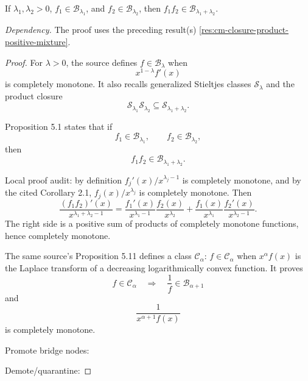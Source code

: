\begin{proposition}
\label{res:gbf-product-closure}
If \(\lambda_1,\lambda_2>0\), \(f_1\in\mathcal B_{\lambda_1}\), and \(f_2\in\mathcal B_{\lambda_2}\), then \(f_1f_2\in\mathcal B_{\lambda_1+\lambda_2}\).

\emph{Dependency.} The proof uses the preceding result(s) \ref{res:cm-closure-product-positive-mixture}.
\end{proposition}
\begin{proof}
For \(\lambda>0\), the source defines \(f\in\mathcal B_\lambda\) when
\[
x^{1-\lambda}f'(x)
\]
is completely monotone. It also recalls generalized Stieltjes classes \(\mathcal S_\lambda\) and the product closure
\[
\mathcal S_{\lambda_1}\mathcal S_{\lambda_2}\subseteq \mathcal S_{\lambda_1+\lambda_2}.
\]

Proposition 5.1 states that if
\[
f_1\in\mathcal B_{\lambda_1},\qquad f_2\in\mathcal B_{\lambda_2},
\]
then
\[
f_1f_2\in\mathcal B_{\lambda_1+\lambda_2}.
\]

Local proof audit: by definition \(f_j'(x)/x^{\lambda_j-1}\) is completely monotone, and by the cited Corollary 2.1, \(f_j(x)/x^{\lambda_j}\) is completely monotone. Then
\[
\frac{(f_1f_2)'(x)}{x^{\lambda_1+\lambda_2-1}}
=
\frac{f_1'(x)}{x^{\lambda_1-1}}\frac{f_2(x)}{x^{\lambda_2}}
+
\frac{f_1(x)}{x^{\lambda_1}}\frac{f_2'(x)}{x^{\lambda_2-1}}.
\]
The right side is a positive sum of products of completely monotone functions, hence completely monotone.

The same source's Proposition 5.11 defines a class \(\mathcal C_\alpha\): \(f\in\mathcal C_\alpha\) when \(x^\alpha f(x)\) is the Laplace transform of a decreasing logarithmically convex function. It proves
\[
f\in\mathcal C_\alpha
\quad\Longrightarrow\quad
\frac1f\in\mathcal B_{\alpha+1}
\]
and
\[
\frac{1}{x^{\alpha+1}f(x)}
\]
is completely monotone.

Promote bridge nodes:

Demote/quarantine:
\end{proof}

